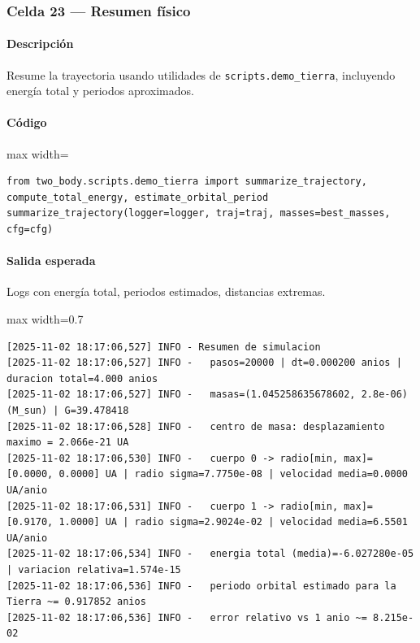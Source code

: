 \subsubsection*{Celda 23 — Resumen físico}
\paragraph{Descripción} Resume la trayectoria usando utilidades de \texttt{scripts.demo\_tierra}, incluyendo energía total y periodos aproximados.
\paragraph{Código}
\par\smallskip
\begin{listing}[H]
\caption{Celda 23: resumen físico de la órbita}
\begin{adjustbox}{max width=\textwidth}
\begin{minipage}{\textwidth}
\begin{verbatim}
from two_body.scripts.demo_tierra import summarize_trajectory, compute_total_energy, estimate_orbital_period
summarize_trajectory(logger=logger, traj=traj, masses=best_masses, cfg=cfg)
\end{verbatim}
\end{minipage}
\end{adjustbox}
\end{listing}
\paragraph{Salida esperada} Logs con energía total, periodos estimados, distancias extremas.

\begin{listing}[H]
\caption{Ejemplo Salida}
\begin{adjustbox}{max width=0.7\textwidth}
\begin{minipage}{\textwidth}
\begin{verbatim}
[2025-11-02 18:17:06,527] INFO - Resumen de simulacion
[2025-11-02 18:17:06,527] INFO -   pasos=20000 | dt=0.000200 anios | duracion total=4.000 anios
[2025-11-02 18:17:06,527] INFO -   masas=(1.045258635678602, 2.8e-06) (M_sun) | G=39.478418
[2025-11-02 18:17:06,528] INFO -   centro de masa: desplazamiento maximo = 2.066e-21 UA
[2025-11-02 18:17:06,530] INFO -   cuerpo 0 -> radio[min, max]=[0.0000, 0.0000] UA | radio sigma=7.7750e-08 | velocidad media=0.0000 UA/anio
[2025-11-02 18:17:06,531] INFO -   cuerpo 1 -> radio[min, max]=[0.9170, 1.0000] UA | radio sigma=2.9024e-02 | velocidad media=6.5501 UA/anio
[2025-11-02 18:17:06,534] INFO -   energia total (media)=-6.027280e-05 | variacion relativa=1.574e-15
[2025-11-02 18:17:06,536] INFO -   periodo orbital estimado para la Tierra ~= 0.917852 anios
[2025-11-02 18:17:06,536] INFO -   error relativo vs 1 anio ~= 8.215e-02
\end{verbatim}
\end{minipage}
\end{adjustbox}
\end{listing}

